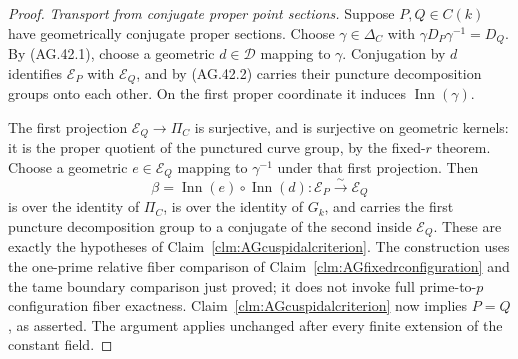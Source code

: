 \begin{proof}
\emph{Transport from conjugate proper point sections.}
Suppose \(P,Q\in C(k)\) have geometrically conjugate
proper sections. Choose
\(\gamma\in\Delta_C\) with
\(\gamma D_P\gamma^{-1}=D_Q\).
By (AG.42.1), choose a geometric
\(d\in\mathcal D\) mapping to \(\gamma\).
Conjugation by \(d\) identifies
\(\mathcal E_P\) with \(\mathcal E_Q\), and by
(AG.42.2) carries their puncture decomposition groups
onto each other. On the first proper coordinate
it induces \(\operatorname{Inn}(\gamma)\).

The first projection
\(\mathcal E_Q\to\Pi_C\) is surjective, and is
surjective on geometric kernels: it is the proper
quotient of the punctured curve group, by the
fixed-\(r\) theorem. Choose a geometric
\(e\in\mathcal E_Q\) mapping to \(\gamma^{-1}\)
under that first projection. Then
\[
            \beta=\operatorname{Inn}(e)\circ
                         \operatorname{Inn}(d):
                 \mathcal E_P\xrightarrow{\sim}\mathcal E_Q
                                                        \tag{AG.42.6}
\]
is over the identity of \(\Pi_C\), is over the
identity of \(G_k\), and carries the first puncture
decomposition group to a conjugate of the second
inside \(\mathcal E_Q\). These are exactly the
hypotheses of Claim~\ref{clm:AGcuspidalcriterion}.
The construction uses the one-prime relative fiber
comparison of Claim~\ref{clm:AGfixedrconfiguration}
and the tame boundary comparison just proved; it does
not invoke full prime-to-\(p\) configuration fiber
exactness. Claim~\ref{clm:AGcuspidalcriterion} now
implies \(P=Q\), as asserted. The argument applies
unchanged after every finite extension of the constant
field.
\end{proof}
